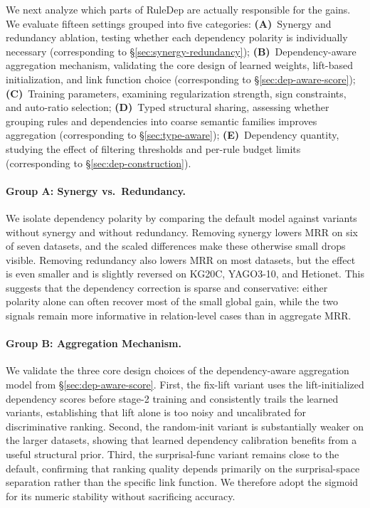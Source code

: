 We next analyze which parts of RuleDep are actually responsible for the gains. We evaluate fifteen settings grouped into five categories:
\textbf{(A)}~Synergy and redundancy ablation, testing whether each dependency polarity is individually necessary (corresponding to \S\ref{sec:synergy-redundancy});
\textbf{(B)}~Dependency-aware aggregation mechanism, validating the core design of learned weights, lift-based initialization, and link function choice (corresponding to \S\ref{sec:dep-aware-score});
\textbf{(C)}~Training parameters, examining regularization strength, sign constraints, and auto-ratio selection;
\textbf{(D)}~Typed structural sharing, assessing whether grouping rules and dependencies into coarse semantic families improves aggregation (corresponding to \S\ref{sec:type-aware});
\textbf{(E)}~Dependency quantity, studying the effect of filtering thresholds and per-rule budget limits (corresponding to \S\ref{sec:dep-construction}).

\paragraph{Group A: Synergy vs.\ Redundancy.}
We isolate dependency polarity by comparing the default model against variants without synergy and without redundancy. Removing synergy lowers MRR on six of seven datasets, and the scaled differences make these otherwise small drops visible. Removing redundancy also lowers MRR on most datasets, but the effect is even smaller and is slightly reversed on KG20C, YAGO3-10, and Hetionet. This suggests that the dependency correction is sparse and conservative: either polarity alone can often recover most of the small global gain, while the two signals remain more informative in relation-level cases than in aggregate MRR.

\paragraph{Group B: Aggregation Mechanism.}
We validate the three core design choices of the dependency-aware aggregation model from \S\ref{sec:dep-aware-score}. First, the fix-lift variant uses the lift-initialized dependency scores before stage-2 training and consistently trails the learned variants, establishing that lift alone is too noisy and uncalibrated for discriminative ranking. Second, the random-init variant is substantially weaker on the larger datasets, showing that learned dependency calibration benefits from a useful structural prior. Third, the surprisal-func variant remains close to the default, confirming that ranking quality depends primarily on the surprisal-space separation rather than the specific link function. We therefore adopt the sigmoid for its numeric stability without sacrificing accuracy.

